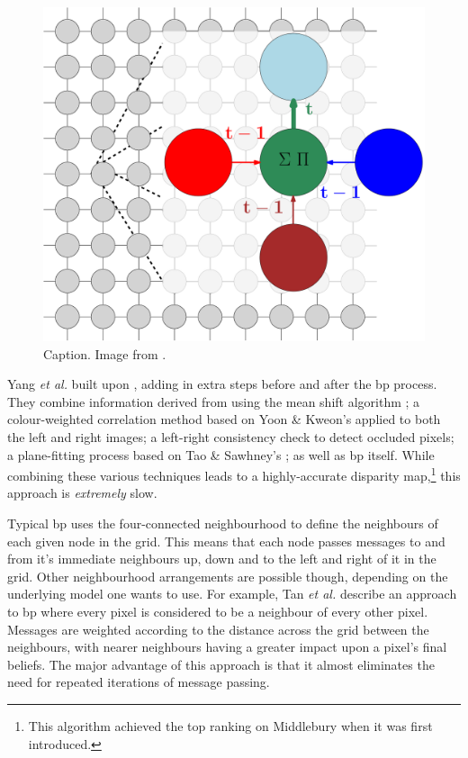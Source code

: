 \begin{figure}
    \centering
    \includegraphics[width=1.0\textwidth]{chapters/litreview/images/bp_diagram-eps-converted-to.pdf}
    \caption{Caption.  Image from \cite{lbpmpsmpic}.}
    \label{fig:bpdiagram}
\end{figure}

Yang \textit{et al.} \cite{Yang2006a} built upon , adding in extra steps before and after the \gls{bp} process.  They combine information derived from using the mean shift algorithm \cite{Comaniciu2002}; a colour-weighted correlation method based on Yoon \& Kweon's \cite{Yoon2006} applied to both the left and right images; a left-right consistency check to detect occluded pixels; a plane-fitting process based on Tao \& Sawhney's \cite{Tao2000}; as well as \gls{bp} itself.  While combining these various techniques leads to a highly-accurate disparity map,\footnote{This algorithm achieved the top ranking on Middlebury when it was first introduced.} this approach is \emph{extremely} slow.

Typical \gls{bp} uses the four-connected neighbourhood to define the neighbours of each given node in the grid.  This means that each node passes messages to and from it's immediate neighbours up, down and to the left and right of it in the grid.  Other neighbourhood arrangements are possible though, depending on the underlying model one wants to use.  For example, Tan \textit{et al.} \cite{Tan2017} describe an approach to \gls{bp} where every pixel is considered to be a neighbour of every other pixel.  Messages are weighted according to the distance across the grid between the neighbours, with nearer neighbours having a greater impact upon a pixel's final beliefs.  The major advantage of this approach is that it almost eliminates the need for repeated iterations of message passing.

